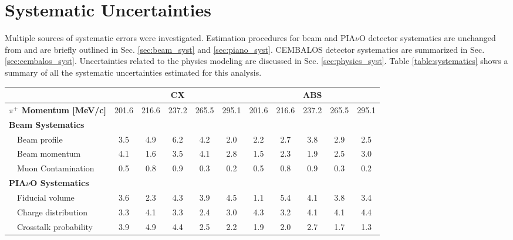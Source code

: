\section{\label{sec:uncertainties}Systematic Uncertainties}
Multiple sources of systematic errors were investigated. Estimation procedures for beam and PIA$\nu$O detector systematics are unchanged from \cite{duet} and are briefly outlined in Sec. \ref{sec:beam_syst} and \ref{sec:piano_syst}. CEMBALOS detector systematics are summarized in Sec. \ref{sec:cembalos_syst}. Uncertainties related to the physics modeling are discussed in Sec. \ref{sec:physics_syst}. Table \ref{table:systematics} shows a summary of all the systematic uncertainties estimated for this analysis.

\begin{table}[htbp]
\begin{center}
\begin{tabular*}{\textwidth}{l|@{\extracolsep{\fill}}ccccc|ccccc}
\hline\hline
& \multicolumn{5}{c}{CX} & \multicolumn{5}{c}{ABS} \\
\hline
{\bfseries$\pi^+$ Momentum [MeV/c]}& 201.6 & 216.6 & 237.2 & 265.5 & 295.1 & 201.6 & 216.6 & 237.2 & 265.5 & 295.1 \\
\hline
  {\bfseries Beam Systematics} & & & & &  & & & & &\\
  ~~Beam profile& 3.5& 4.9& 6.2& 4.2& 2.0& 2.2& 2.7& 3.8& 2.9& 2.5 \\
  ~~Beam momentum& 4.1& 1.6& 3.5& 4.1& 2.8& 1.5& 2.3& 1.9& 2.5& 3.0 \\
  ~~Muon Contamination& 0.5& 0.8& 0.9& 0.3& 0.2& 0.5& 0.8& 0.9& 0.3& 0.2 \\
  \hline
  {\bfseries PIA$\nu$O Systematics} & & & & &  & & & & &\\
  ~~Fiducial volume& 3.6& 2.3& 4.3& 3.9& 4.5& 1.1& 5.4& 4.1& 3.8& 3.4 \\
  ~~Charge distribution& 3.3& 4.1& 3.3& 2.4& 3.0& 4.3& 3.2& 4.1& 4.1& 4.4 \\
  ~~Crosstalk probability& 3.9& 4.9& 4.4& 2.5& 2.2& 1.9& 2.0& 2.7& 1.7& 1.3 \\

\end{tabular*}
\end{center}
\end{table}
